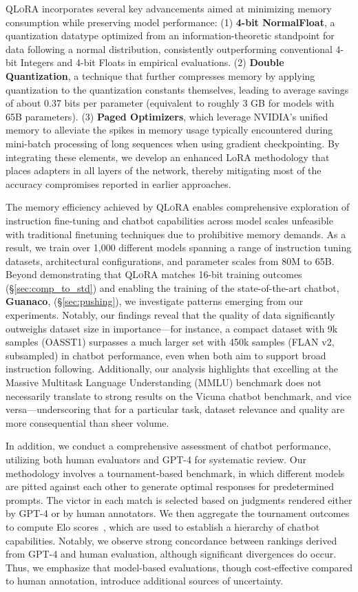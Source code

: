 \textsc{QLoRA} incorporates several key advancements aimed at minimizing memory consumption while preserving model performance: (1) \textbf{4-bit NormalFloat}, a quantization datatype optimized from an information-theoretic standpoint for data following a normal distribution, consistently outperforming conventional 4-bit Integers and 4-bit Floats in empirical evaluations. (2) \textbf{Double Quantization}, a technique that further compresses memory by applying quantization to the quantization constants themselves, leading to average savings of about 0.37 bits per parameter (equivalent to roughly 3 GB for models with 65B parameters). (3) \textbf{Paged Optimizers}, which leverage NVIDIA’s unified memory to alleviate the spikes in memory usage typically encountered during mini-batch processing of long sequences when using gradient checkpointing. By integrating these elements, we develop an enhanced LoRA methodology that places adapters in all layers of the network, thereby mitigating most of the accuracy compromises reported in earlier approaches.

The memory efficiency achieved by \textsc{QLoRA} enables comprehensive exploration of instruction fine-tuning and chatbot capabilities across model scales unfeasible with traditional finetuning techniques due to prohibitive memory demands. As a result, we train over 1,000 different models spanning a range of instruction tuning datasets, architectural configurations, and parameter scales from 80M to 65B. Beyond demonstrating that \textsc{QLoRA} matches 16-bit training outcomes (\S\ref{sec:comp_to_std}) and enabling the training of the state-of-the-art chatbot, \textbf{Guanaco}, (\S\ref{sec:pushing}), we investigate patterns emerging from our experiments. Notably, our findings reveal that the quality of data significantly outweighs dataset size in importance—for instance, a compact dataset with 9k samples (OASST1) surpasses a much larger set with 450k samples (FLAN v2, subsampled) in chatbot performance, even when both aim to support broad instruction following. Additionally, our analysis highlights that excelling at the Massive Multitask Language Understanding (MMLU) benchmark does not necessarily translate to strong results on the Vicuna chatbot benchmark, and vice versa—underscoring that for a particular task, dataset relevance and quality are more consequential than sheer volume.

In addition, we conduct a comprehensive assessment of chatbot performance, utilizing both human evaluators and GPT-4 for systematic review. Our methodology involves a tournament-based benchmark, in which different models are pitted against each other to generate optimal responses for predetermined prompts. The victor in each match is selected based on judgments rendered either by GPT-4 or by human annotators. We then aggregate the tournament outcomes to compute Elo scores~\citep{elo1967proposed, elo1978rating}, which are used to establish a hierarchy of chatbot capabilities. Notably, we observe strong concordance between rankings derived from GPT-4 and human evaluation, although significant divergences do occur. Thus, we emphasize that model-based evaluations, though cost-effective compared to human annotation, introduce additional sources of uncertainty.

